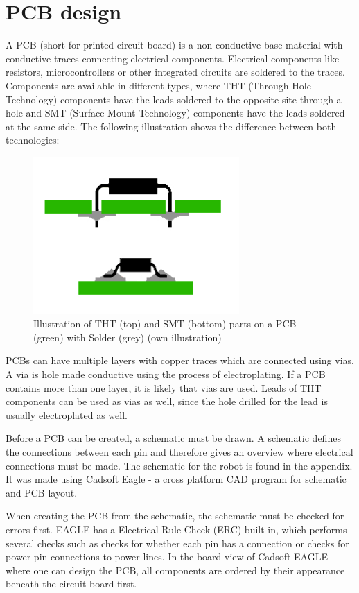 \section{PCB design} 
A PCB (short for printed circuit board) is a non-conductive base material with conductive traces connecting electrical components. Electrical components like resistors, microcontrollers or other integrated circuits are soldered to the traces. Components are available in different types, where THT (Through-Hole-Technology) components have the leads soldered to the opposite site through a hole and SMT (Surface-Mount-Technology) components have the leads soldered at the same side. The following illustration shows the difference between both technologies:

\begin{figure}[H]
  \centering
  \includegraphics[width=0.7\textwidth]{images/part_types_thtsmt.jpg}
  \caption{Illustration of THT (top) and SMT (bottom) parts on a PCB (green) with Solder (grey) (own illustration)}
\end{figure}

PCBs can have multiple layers with copper traces which are connected using vias. A via is hole made conductive using the process of electroplating. If a PCB contains more than one layer, it is likely that vias are used. Leads of THT components can be used as vias as well, since the hole drilled for the lead is usually electroplated as well.

Before a PCB can be created, a schematic must be drawn. A schematic defines the connections between each pin and therefore gives an overview where electrical connections must be made. The schematic for the robot is found in the appendix. It was made using Cadsoft Eagle - a cross platform CAD program for schematic and PCB layout.

When creating the PCB from the schematic, the schematic must be checked for errors first. EAGLE has a Electrical Rule Check (ERC) built in, which performs several checks such as checks for whether each pin has a connection or checks for power pin connections to power lines. In the board view of Cadsoft EAGLE where one can design the PCB, all components are ordered by their appearance beneath the circuit board first.

